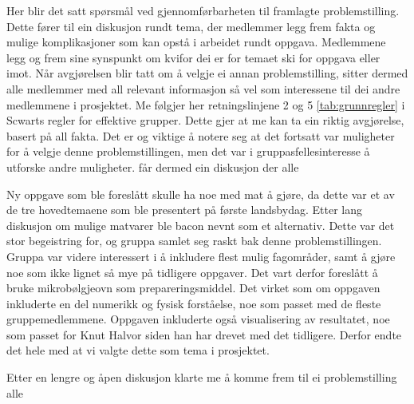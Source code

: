 Her blir det satt spørsmål ved gjennomførbarheten til framlagte problemstilling. Dette
fører til ein diskusjon rundt tema, der medlemmer legg frem fakta og mulige komplikasjoner 
som kan opstå i arbeidet rundt oppgava. Medlemmene legg og frem sine synspunkt om kvifor 
dei er for temaet ski for oppgava eller imot. Når avgjørelsen blir tatt om å velgje ei
annan problemstilling, sitter dermed alle medlemmer med all relevant informasjon så vel som interessene 
til dei andre medlemmene i prosjektet. Me følgjer her retningslinjene 2 og 5 \ref{tab:grunnregler} i Scwarts
regler for effektive grupper. Dette gjer at me kan ta ein riktig avgjørelse, basert på all fakta. Det er og 
viktige å notere seg at det fortsatt var muligheter for å velgje denne problemstillingen, men 
det var i gruppasfellesinteresse å utforske andre muligheter. 
får dermed ein diskusjon
der alle  

Ny oppgave som ble foreslått skulle ha noe med mat å gjøre, da dette var et av
de tre hovedtemaene som ble presentert på første landsbydag. Etter lang
diskusjon om mulige matvarer ble bacon nevnt som et alternativ. Dette var det
stor begeistring for, og gruppa samlet seg raskt bak denne problemstillingen.
Gruppa var videre interessert i å inkludere flest mulig fagområder, samt å
gjøre noe som ikke lignet så mye på tidligere oppgaver. Det vart derfor foreslått
å bruke mikrobølgjeovn som prepareringsmiddel. Det virket som om oppgaven inkluderte en del
numerikk og fysisk forståelse, noe som passet med de fleste gruppemedlemmene.
Oppgaven inkluderte også visualisering av resultatet, noe som passet for Knut
Halvor siden han har drevet med det tidligere. Derfor endte det hele
med at vi valgte dette som tema i prosjektet.

Etter en lengre og åpen diskusjon klarte me å komme frem til ei problemstilling 
alle 



